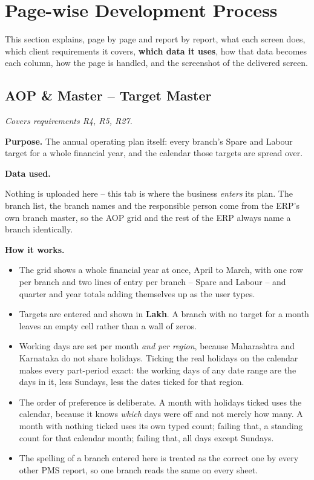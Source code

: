 \documentclass[11pt,a4paper]{article}
\newcommand{\covers}[1]{\textit{Covers requirements #1.}\par}
\newcommand{\purpose}[1]{\textbf{Purpose.} #1\par}
\newcommand{\dataused}{\textbf{Data used.}\par}
\newcommand{\devproc}{\textbf{How it works.}\par}
\begin{document}
\section{Page-wise Development Process}

This section explains, page by page and report by report, what each screen does, which
client requirements it covers, \textbf{which data it uses}, how that data becomes each
column, how the page is handled, and the screenshot of the delivered screen.

\subsection{AOP \& Master -- Target Master}
\covers{R4, R5, R27}

\purpose{The annual operating plan itself: every branch's Spare and Labour target for a
whole financial year, and the calendar those targets are spread over.}

\dataused
Nothing is uploaded here -- this tab is where the business \emph{enters} its plan. The
branch list, the branch names and the responsible person come from the ERP's own branch
master, so the AOP grid and the rest of the ERP always name a branch identically.

\devproc
\begin{itemize}
  \item The grid shows a whole financial year at once, April to March, with one row per
  branch and two lines of entry per branch -- Spare and Labour -- and quarter and year
  totals adding themselves up as the user types.
  \item Targets are entered and shown in \textbf{Lakh}. A branch with no target for a
  month leaves an empty cell rather than a wall of zeros.
  \item Working days are set per month \emph{and per region}, because Maharashtra and
  Karnataka do not share holidays. Ticking the real holidays on the calendar makes every
  part-period exact: the working days of any date range are the days in it, less Sundays,
  less the dates ticked for that region.
  \item The order of preference is deliberate. A month with holidays ticked uses the
  calendar, because it knows \emph{which} days were off and not merely how many. A month
  with nothing ticked uses its own typed count; failing that, a standing count for that
  calendar month; failing that, all days except Sundays.
  \item The spelling of a branch entered here is treated as the correct one by every
  other PMS report, so one branch reads the same on every sheet.
\end{itemize}
\end{document}

